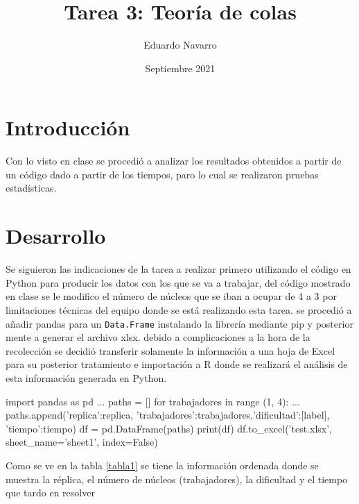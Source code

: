 \documentclass{article}
\title{Tarea 3: Teoría de colas}
\author{Eduardo Navarro}
\date{Septiembre 2021}
\begin{document}
\maketitle

\section{Introducción}
Con lo visto en clase se procedió a analizar los resultados obtenidos a partir de un código dado a partir de los tiempos, paro lo cual se realizaron pruebas estadísticas.

\section{Desarrollo}

Se siguieron las indicaciones de la tarea \cite{colas} a realizar primero utilizando el código en Python para producir los datos con los que se va a trabajar, del código mostrado en clase\cite{youtubesimu} se le modifico el número de núcleos que se iban a ocupar de 4 a 3 por limitaciones técnicas del equipo donde se está realizando esta tarea. se procedió a añadir pandas \cite{pandas} para un \texttt{Data.Frame} instalando la librería mediante pip y posterior mente a generar el archivo xlsx. debido a complicaciones a la hora de la recolección se decidió transferir solamente la información a una hoja de Excel para su posterior tratamiento e importación a R donde se realizará el análisis de esta información generada en Python.

\vspace{5mm}
\begin{python}
import pandas as pd ...
  paths = [] 
  for trabajadores in range (1, 4): ...
   paths.append({'replica':replica,
   'trabajadores':trabajadores,'dificultad':[label],
   'tiempo':tiempo})
   df = pd.DataFrame(paths)
 print(df)
 df.to_excel('test.xlsx', sheet_name='sheet1',
 index=False)
\end{python}
\vspace{5mm}

Como se ve en la tabla \ref{tabla1} se tiene la información ordenada donde se muestra la réplica, el número de núcleos (trabajadores), la dificultad y el tiempo que tardo en resolver
\end{document}
